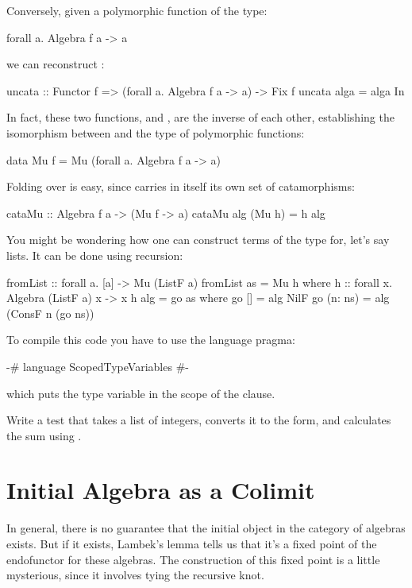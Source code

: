 \documentclass[DaoFP]{subfiles}
\begin{document}
Conversely, given a polymorphic function of the type:
\begin{haskell}
forall a. Algebra f a -> a
\end{haskell}
we can reconstruct :
\begin{haskell}
uncata :: Functor f => (forall a. Algebra f a -> a) -> Fix f
uncata alga = alga In
\end{haskell}
In fact, these two functions,  and , are the inverse of each other, establishing the isomorphism between  and the type of polymorphic functions:
\begin{haskell}
data Mu f = Mu (forall a. Algebra f a -> a)
\end{haskell}
Folding over  is easy, since  carries in itself its own set of catamorphisms:
\begin{haskell}
cataMu :: Algebra f a -> (Mu f -> a)
cataMu alg (Mu h) = h alg
\end{haskell}

You might be wondering how one can construct terms of the type  for, let's say lists. It can be done using recursion:
\begin{haskell}
fromList :: forall a. [a] -> Mu (ListF a)
fromList as = Mu h
  where h :: forall x. Algebra (ListF a) x -> x
        h alg = go as
          where
            go [] = alg NilF
            go (n: ns) = alg (ConsF n (go ns))
\end{haskell}
To compile this code you have to use the language pragma:
\begin{haskell}
{-# language ScopedTypeVariables #-}
\end{haskell}
which puts the type variable  in the scope of the  clause.

\begin{exercise}
Write a test that takes a list of integers, converts it to the  form, and calculates the sum using .
\end{exercise}


\section{Initial Algebra as a Colimit}

In general, there is no guarantee that the initial object in the category of algebras exists. But if it exists, Lambek's lemma tells us that it's a fixed point of the endofunctor for these algebras.  The construction of this fixed point is a little mysterious, since it involves tying the recursive knot. 
\end{document}
